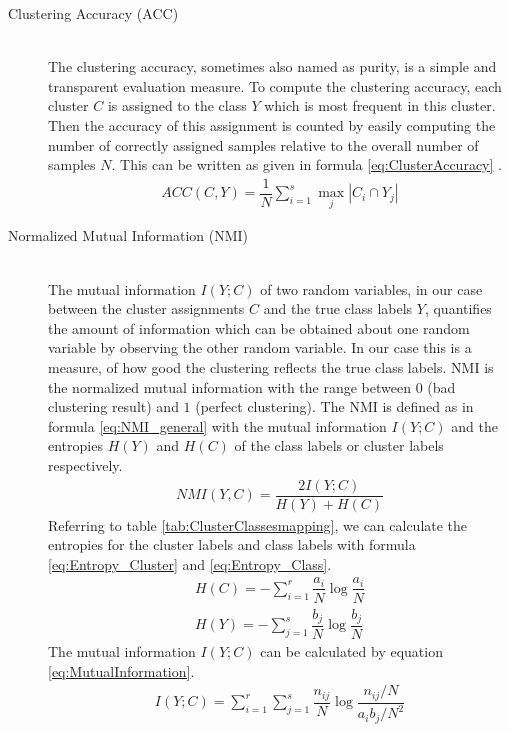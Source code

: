 \documentclass[12pt,DIV14,BCOR12mm,a4paper,footexclude,headinclude,halfparskip-,twoside,openright,openany,cleardoubleempty,idxtotoc,bibtotoc]{scrreprt} %
\numberwithin{equation}{chapter}
\begin{document}
\begin{description}
	\item[Clustering Accuracy (ACC)]\hfill \\
	The clustering accuracy, sometimes also named as purity, is a simple and transparent evaluation measure. To compute the clustering accuracy, each cluster $C$ is assigned to the class $Y$ which is most frequent in this cluster. Then the accuracy of this assignment is counted by easily computing the number of correctly assigned samples relative to the overall number of samples $N$. This can be written as given in formula \ref{eq:ClusterAccuracy} \cite{Manning08InformationRetrieval}.
	\begin{align}
		ACC(C,Y) = \dfrac{1}{N}\sum_{i=1}^s\underset{j}\max|C_i\cap Y_j|\label{eq:ClusterAccuracy}
	\end{align}
	\item[Normalized Mutual Information (NMI)]\hfill \\
	The mutual information $I(Y;C)$ of two random variables, in our case between the cluster assignments $C$ and the true class labels $Y$, quantifies the amount of information which can be obtained about one random variable by observing the other random variable. In our case this is a measure, of how good the clustering reflects the true class labels. NMI is the normalized mutual information with the range between $0$ (bad clustering result) and $1$ (perfect clustering). The NMI is defined as in formula \ref{eq:NMI_general} with the mutual information $I(Y;C)$ and the entropies $H(Y)$ and $H(C)$ of the class labels or cluster labels respectively.
	\begin{align}
		NMI(Y,C) = \dfrac{2I(Y;C)}{H(Y)+H(C)}\label{eq:NMI_general}
	\end{align}
	Referring to table \ref{tab:ClusterClassesmapping}, we can calculate the entropies for the cluster labels and class labels with formula \ref{eq:Entropy_Cluster} and \ref{eq:Entropy_Class}.
	\begin{align}
		H(C) = -\sum_{i=1}^r\dfrac{a_i}{N}\log\dfrac{a_i}{N}\label{eq:Entropy_Cluster}\\
		H(Y) = -\sum_{j=1}^s\dfrac{b_j}{N}\log\dfrac{b_j}{N}\label{eq:Entropy_Class}
	\end{align}
	The mutual information $I(Y;C)$ can be calculated by equation \ref{eq:MutualInformation}.
	\begin{align}
		I(Y;C) = \sum_{i=1}^r\sum_{j=1}^s\dfrac{n_{ij}}{N}\log\dfrac{n_{ij}/N}{a_ib_j/N^2}\label{eq:MutualInformation}
	\end{align}

\end{description}
\end{document}
